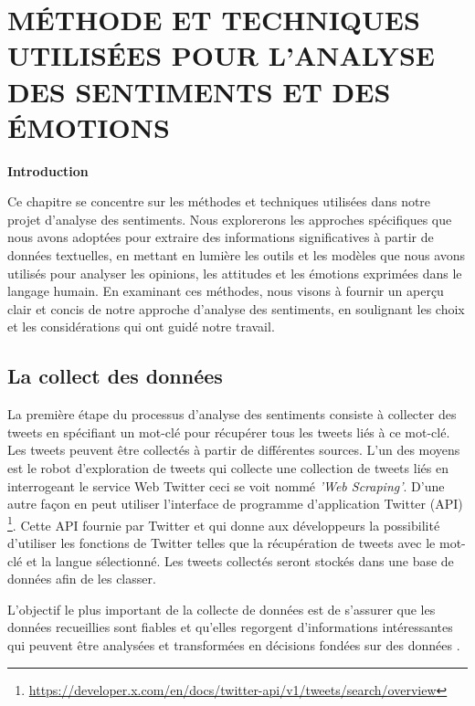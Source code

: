 \clearpage
\chapter{MÉTHODE ET TECHNIQUES UTILISÉES POUR L'ANALYSE DES SENTIMENTS ET DES ÉMOTIONS}




\textbf{Introduction}\par
Ce chapitre se concentre sur les méthodes et techniques utilisées dans notre projet d'analyse des sentiments. Nous explorerons les approches spécifiques que nous avons adoptées pour extraire des informations significatives à partir de données textuelles, en mettant en lumière les outils et les modèles que nous avons utilisés pour analyser les opinions, les attitudes et les émotions exprimées dans le langage humain. En examinant ces méthodes, nous visons à fournir un aperçu clair et concis de notre approche d'analyse des sentiments, en soulignant les choix et les considérations qui ont guidé notre travail.





\section{La collect des données}
La première étape du processus d'analyse des sentiments consiste à collecter des tweets en spécifiant un mot-clé pour récupérer tous les tweets liés à ce mot-clé. Les tweets peuvent être collectés à partir de différentes sources. L'un des moyens est le robot d'exploration de tweets qui collecte une collection de tweets liés en interrogeant le service Web Twitter ceci se voit nommé \textit{'Web Scraping'}. D’une autre façon en peut utiliser l'interface de programme d'application Twitter (API) \footnote{\href{https://developer.x.com/en/docs/twitter-api/v1/tweets/search/overview} {https://developer.x.com/en/docs/twitter-api/v1/tweets/search/overview}}. Cette API fournie par Twitter et qui donne aux développeurs la possibilité d'utiliser les fonctions de Twitter telles que la récupération de tweets avec le mot-clé et la langue sélectionné. Les tweets collectés seront stockés dans une base de données afin de les classer.

L'objectif le plus important de la collecte de données est de s'assurer que les données recueillies sont fiables et qu'elles regorgent d'informations intéressantes qui peuvent être analysées et transformées en décisions fondées sur des données \cite{questionpro}. 

